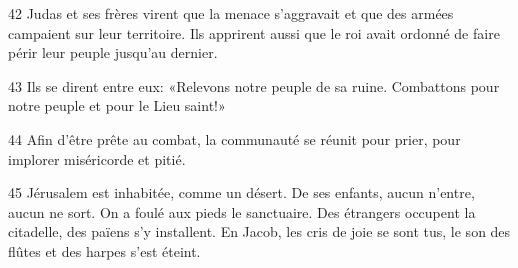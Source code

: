 42 Judas et ses frères virent que la menace s’aggravait et que des armées campaient sur leur territoire. Ils apprirent aussi que le roi avait ordonné de faire périr leur peuple jusqu’au dernier.

43 Ils se dirent entre eux: «Relevons notre peuple de sa ruine. Combattons pour notre peuple et pour le Lieu saint!»

44 Afin d’être prête au combat, la communauté se réunit pour prier, pour implorer miséricorde et pitié.

45 Jérusalem est inhabitée, comme un désert. De ses enfants, aucun n’entre, aucun ne sort. On a foulé aux pieds le sanctuaire. Des étrangers occupent la citadelle, des païens s’y installent. En Jacob, les cris de joie se sont tus, le son des flûtes et des harpes s’est éteint.
